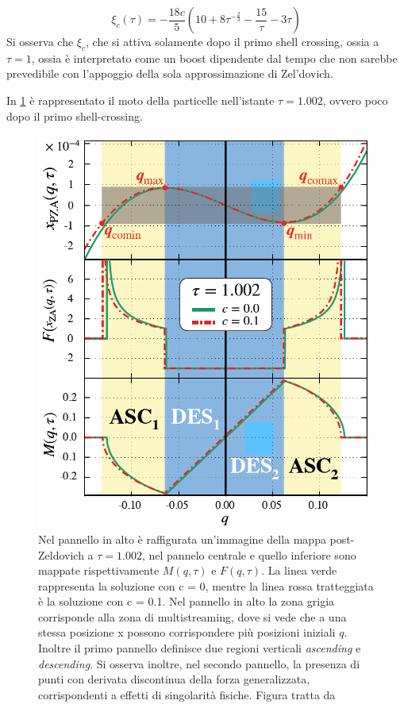 \begin{equation}
    \label{eqn:xic}
    \xi_c(\tau)= -\frac{18c}{5}\left(10+8\tau^{-\frac{2}{3}}-\frac{15}{\tau}-3\tau\right)
\end{equation}
Si osserva che $\xi_c$, che si attiva solamente dopo il primo shell crossing, ossia a $\tau=1$,
ossia è interpretato come un boost dipendente dal tempo che non sarebbe prevedibile con l'appoggio
della sola approssimazione di Zel'dovich.

In \ref{fig:fig1} è rappresentato il moto della particelle nell'istante $\tau=1.002$, ovvero
poco dopo il primo shell-crossing.

\begin{center}
    \begin{figure}[H]
        \centering
        \includegraphics[scale=0.5, angle=0]{fig1.png}
        \caption{Nel pannello in alto è raffigurata un'immagine della mappa post-Zeldovich a $\tau=1.002$,
        nel pannelo centrale e quello inferiore sono mappate rispettivamente $M(q, \tau)$ e $F(q, \tau)$.
        La linea verde rappresenta la soluzione con c = 0, mentre la linea rossa tratteggiata è la soluzione
        con c = 0.1. Nel pannello in alto la zona grigia corrisponde alla zona di multistreaming, dove si
        vede che a una stessa posizione x possono corrispondere più posizioni iniziali $q$. Inoltre il primo 
        pannello definisce due regioni verticali \textit{ascending} e \textit{descending}.
        Si osserva inoltre, nel secondo pannello, la presenza di punti con derivata discontinua della forza
        generalizzata, corrispondenti a effetti di singolarità fisiche. Figura tratta da \cite{rampf.}
        }
        \label{fig:fig1}
	\end{figure}
\end{center}

